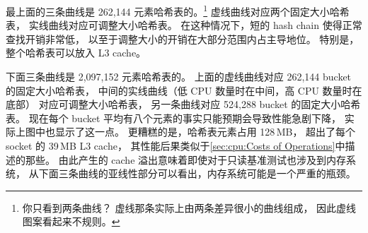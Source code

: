 最上面的三条曲线是 262,144 元素哈希表的。\footnote{
	你只看到两条曲线？
	虚线那条实际上由两条差异很小的曲线组成，
	因此虚线图案看起来不规则。}
虚线曲线对应两个固定大小哈希表，
实线曲线对应可调整大小哈希表。
在这种情况下，短的 hash chain 使得正常查找开销非常低，
以至于调整大小的开销在大部分范围内占主导地位。
特别是，整个哈希表可以放入 L3 cache。

下面三条曲线是 2,097,152 元素哈希表的。
上面的虚线曲线对应 262,144 bucket 的固定大小哈希表，
中间的实线曲线（低 CPU 数量时在中间，高 CPU 数量时在底部）
对应可调整大小哈希表，
另一条曲线对应 524,288 bucket 的固定大小哈希表。
现在每个 bucket 平均有八个元素的事实只能预期会导致性能急剧下降，
实际上图中也显示了这一点。
更糟糕的是，哈希表元素占用 128\,MB，
超出了每个 socket 的 39\,MB L3 cache，
其性能后果类似于\cref{sec:cpu:Costs of Operations}中描述的那些。
由此产生的 cache 溢出意味着即使对于只读基准测试也涉及到内存系统，
从下面三条曲线的亚线性部分可以看出，内存系统可能是一个严重的瓶颈。

